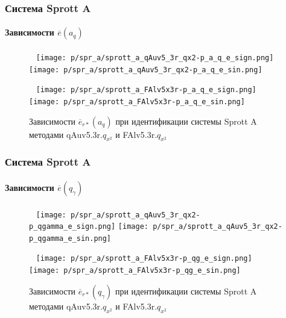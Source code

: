 \documentclass[10pt,utf8]{beamer}
\begin{document}

\begin{frame}
  \frametitle{Система Sprott A}
  \framesubtitle{Зависимости $\overline{e}(a_q)$}

  \begin{figure}[h!]
    \centerline{
      {~}\hfill
      \texttt{[image: p/spr\_a/sprott\_a\_qAuv5\_3r\_qx2-p\_a\_q\_e\_sign.png]}
      \hfill
      \texttt{[image: p/spr\_a/sprott\_a\_qAuv5\_3r\_qx2-p\_a\_q\_e\_sin.png]}
      \hfill{~}
    }
    \centerline{
      {~}\hfill
      \texttt{[image: p/spr\_a/sprott\_a\_FAlv5x3r-p\_a\_q\_e\_sign.png]}
      \hfill
      \texttt{[image: p/spr\_a/sprott\_a\_FAlv5x3r-p\_a\_q\_e\_sin.png]}
      \hfill{~}
    }
    \caption{Зависимости $\overline{e}_{r*}(a_q)$ при идентификации системы Sprott A методами  qAuv5.3r.$q_{x^2}$ и  FAlv5.3r.$q_{x^2}$ }
    \label{atu:f:spr_a_a_q_qF.q_x2}
  \end{figure}


\end{frame}



\begin{frame}
  \frametitle{Система Sprott A}
  \framesubtitle{Зависимости $\overline{e}(q_\gamma)$}

  \begin{figure}[h!]
    \centerline{
      {~}\hfill
      \texttt{[image: p/spr\_a/sprott\_a\_qAuv5\_3r\_qx2-p\_qgamma\_e\_sign.png]}
      \hfill
      \texttt{[image: p/spr\_a/sprott\_a\_qAuv5\_3r\_qx2-p\_qgamma\_e\_sin.png]}
      \hfill{~}
    }
    \centerline{
      {~}\hfill
      \texttt{[image: p/spr\_a/sprott\_a\_FAlv5x3r-p\_qg\_e\_sign.png]}
      \hfill
      \texttt{[image: p/spr\_a/sprott\_a\_FAlv5x3r-p\_qg\_e\_sin.png]}
      \hfill{~}
    }
    \caption{Зависимости $\overline{e}_{r*}(q_\gamma)$ при идентификации системы Sprott A методами  qAuv5.3r.$q_{x^2}$ и  FAlv5.3r.$q_{x^2}$ }
    \label{atu:f:spr_a_qg_qF.q_x2}
  \end{figure}



\end{frame}
\end{document}
